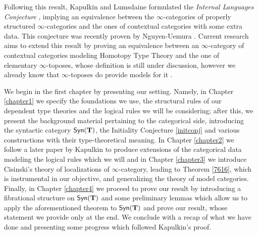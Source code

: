 Following this result, Kapulkin and Lumsdaine formulated the \emph{Internal
Languages Conjecture} \cite[Conj.\ 3.7]{KL16}, implying an equivalence between
the $\infty$-categories of properly structured $\infty$-categories and the ones
of contextual categories with some extra data. This conjecture
was recently proven by Nguyen-Uemura \cite{NU22}. Current research aims to
extend this result by proving an equivalence between an $\infty$-category of
contextual categories modeling Homotopy Type Theory and the one of elementary
$\infty$-toposes, whose definition is still under discussion, however we already
know that $\infty$-toposes do provide models for it \cite{Shu19}.

\begin{organization}
  We begin in the first chapter by presenting our setting. Namely, in
  Chapter \ref{chapter1} we specify the foundations we use, the structural rules of our
  dependent type theories and the logical rules we will be considering; after
  this, we present the background material pertaining to the categorical side,
  introducing the syntactic category $\mathsf{Syn}(\mathbf{T})$, the Initiality Conjecture
  \ref{initconj} and various constructions
  with their type-theoretical meaning. In Chapter \ref{chapter2} we follow
  a later paper by Kapulkin \cite{Kap17} to produce
  extensions of the categorical data modeling the logical rules which we will
  and in Chapter
  \ref{chapter3} we introduce Cisinski's theory of localizations of
  $\infty$-category, leading to Theorem \ref{7616}, which is instrumental in our
  objective, and generalizing the theory of model categories. Finally, in
  Chapter \ref{chapter4} we proceed to prove our result by introducing a
  fibrational structure on $\mathsf{Syn}(\mathbf{T})$ \cite{AKL15} and some preliminary lemmas
  which allow us
  to apply the aforementioned theorem to $\mathsf{Syn}(\mathbf{T})$ and prove our result,
  whose statement we provide only at the end. We conclude with a
  recap of what we have done and presenting some progress which followed
  Kapulkin's proof.
\end{organization}
